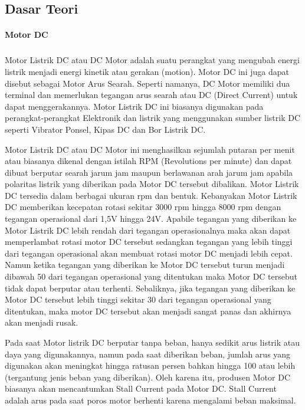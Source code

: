 \documentclass[12pt,a4paper]{article}
\begin{document}
\subsection{Dasar Teori}
\paragraph{ }
\textbf{Motor DC}
\subparagraph{ }
Motor Listrik DC atau DC Motor adalah suatu perangkat yang mengubah energi listrik menjadi energi kinetik atau gerakan (motion). Motor DC ini juga dapat disebut sebagai Motor Arus Searah. Seperti namanya, DC Motor memiliki dua terminal dan memerlukan tegangan arus searah atau DC (Direct Current) untuk dapat menggerakannya. Motor Listrik DC ini biasanya digunakan pada perangkat-perangkat Elektronik dan listrik yang menggunakan sumber listrik DC seperti Vibrator Ponsel, Kipas DC dan Bor Listrik DC.

	Motor Listrik DC atau DC Motor ini menghasilkan sejumlah putaran per menit atau biasanya dikenal dengan istilah RPM (Revolutions per minute) dan dapat dibuat berputar searah jarum jam maupun berlawanan arah jarum jam apabila polaritas listrik yang diberikan pada Motor DC tersebut dibalikan. Motor Listrik DC tersedia dalam berbagai ukuran rpm dan bentuk. Kebanyakan Motor Listrik DC memberikan kecepatan rotasi  sekitar 3000 rpm hingga 8000 rpm dengan tegangan operasional dari 1,5V hingga 24V. Apabile tegangan yang diberikan ke Motor Listrik DC lebih rendah dari tegangan operasionalnya maka akan dapat memperlambat rotasi motor DC tersebut sedangkan tegangan yang lebih tinggi dari tegangan operasional akan membuat rotasi motor DC menjadi lebih cepat. Namun ketika tegangan yang diberikan ke Motor DC tersebut turun menjadi dibawah 50 dari tegangan operasional yang ditentukan maka Motor DC tersebut tidak dapat berputar atau terhenti. Sebaliknya, jika tegangan yang diberikan ke Motor DC tersebut lebih tinggi sekitar 30 dari tegangan operasional yang ditentukan, maka motor DC tersebut akan menjadi sangat panas dan akhirnya akan menjadi rusak.
	
	Pada saat Motor listrik DC berputar tanpa beban, hanya sedikit arus listrik atau daya yang digunakannya, namun pada saat diberikan beban, jumlah arus yang digunakan akan meningkat hingga ratusan persen bahkan hingga 100 atau lebih (tergantung jenis beban yang diberikan). Oleh karena itu, produsen Motor DC biasanya akan mencantumkan Stall Current pada Motor DC. Stall Current adalah arus pada saat poros motor berhenti karena mengalami beban maksimal.
\end{document}
